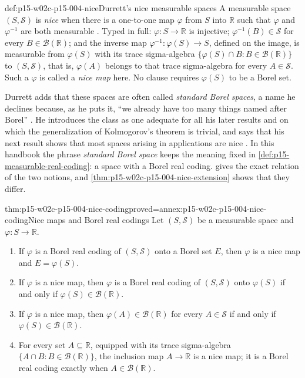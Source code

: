\begin{hbdefinition}{def:p15-w02c-p15-004-nice}{Durrett's nice measurable spaces}
A measurable space \((S,\mathcal S)\) is \emph{nice} when there is a
one-to-one map \(\varphi\) from \(S\) into \(\mathbb R\) such that
\(\varphi\) and \(\varphi^{-1}\) are both measurable
\cite[p.~53]{DurrettPTEAuthor2019}. Typed in full: \(\varphi:S\to\mathbb R\)
is injective; \(\varphi^{-1}(B)\in\mathcal S\) for every
\(B\in\mathcal B(\mathbb R)\); and the inverse map
\(\varphi^{-1}:\varphi(S)\to S\), defined on the image, is measurable from
\(\varphi(S)\) with its trace sigma-algebra
\(\{\varphi(S)\cap B:B\in\mathcal B(\mathbb R)\}\) to \((S,\mathcal S)\),
that is, \(\varphi(A)\) belongs to that trace sigma-algebra for every
\(A\in\mathcal S\). Such a \(\varphi\) is called a \emph{nice map} here.
No clause requires \(\varphi(S)\) to be a Borel set.

Durrett adds that these spaces are often called \emph{standard Borel
spaces}, a name he declines because, as he puts it, ``we already have too
many things named after Borel'' \cite[p.~53]{DurrettPTEAuthor2019}. He
introduces the class as one adequate for all his later results and on
which the generalization of Kolmogorov's theorem is trivial, and says that
his next result shows that most spaces arising in applications are nice
\cite[p.~53]{DurrettPTEAuthor2019}. In this handbook the phrase
\emph{standard Borel space} keeps the meaning fixed in
\cref{def:p15-measurable-real-coding}: a space with a Borel real coding.
 gives the exact relation of the
two notions, and \cref{thm:p15-w02c-p15-004-nice-extension} shows that
they differ.
\end{hbdefinition}

\begin{hbtheorem}{thm:p15-w02c-p15-004-nice-coding}{proved=annex:p15-w02c-p15-004-nice-coding}{Nice maps and Borel real codings}
Let \((S,\mathcal S)\) be a measurable space and \(\varphi:S\to\mathbb R\).
\begin{enumerate}
\item If \(\varphi\) is a Borel real coding of \((S,\mathcal S)\) onto a
      Borel set \(E\), then \(\varphi\) is a nice map and \(E=\varphi(S)\).
\item If \(\varphi\) is a nice map, then \(\varphi\) is a Borel real coding
      of \((S,\mathcal S)\) onto \(\varphi(S)\) if and only if
      \(\varphi(S)\in\mathcal B(\mathbb R)\).
\item If \(\varphi\) is a nice map, then \(\varphi(A)\in\mathcal B(\mathbb R)\)
      for every \(A\in\mathcal S\) if and only if
      \(\varphi(S)\in\mathcal B(\mathbb R)\).
\item For every set \(A\subseteq\mathbb R\), equipped with its trace
      sigma-algebra \(\{A\cap B:B\in\mathcal B(\mathbb R)\}\), the
      inclusion map \(A\to\mathbb R\) is a nice map; it is a Borel real
      coding exactly when \(A\in\mathcal B(\mathbb R)\).
\end{enumerate}
\end{hbtheorem}


